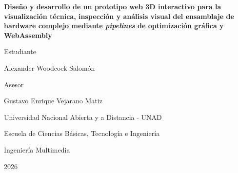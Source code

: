 \documentclass[12pt,letterpaper]{article} %
\begin{document}
\begin{titlepage}
    \thispagestyle{plain} %
    \centering
    {\normalfont\bfseries Dise\~no y desarrollo de un prototipo web 3D interactivo para la visualizaci\'on t\'ecnica, inspecci\'on y an\'alisis visual del ensamblaje de hardware complejo mediante \textit{pipelines} de optimizaci\'on gr\'afica y WebAssembly\par}

    \vspace{2\baselineskip}
    \vspace{2\baselineskip}

    {\normalfont Estudiante\par}
    {\normalfont Alexander Woodcock Salom\'on\par}

    \vspace{2\baselineskip}
    \vspace{2\baselineskip}

    {\normalfont Asesor\par}
    {\normalfont Gustavo Enrique Vejarano Matiz\par}

    \vfill

    {\normalfont Universidad Nacional Abierta y a Distancia - UNAD\par
     Escuela de Ciencias B\'asicas, Tecnolog\'ia e Ingenier\'ia\par
     Ingenier\'ia Multimedia\par}

    \vspace{1\baselineskip}
    {2026\par}
\end{titlepage}
\setcounter{page}{2}

\pagestyle{fancy}

\end{document}
